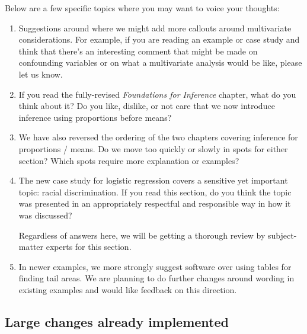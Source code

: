 \noindent%
Below are a few specific topics where you may
want to voice your thoughts:
\begin{enumerate}
\item
    Suggestions around where we might add more
    callouts around multivariate considerations.
    For example, if you are reading an example
    or case study and think that there's an
    interesting comment that might be made on
    confounding variables or on what a multivariate
    analysis would be like, please let us know.
\item
    If you read the fully-revised
    \emph{Foundations for Inference} chapter,
    what do you think about it?
    Do you like, dislike, or not care that we
    now introduce inference using proportions
    before means?
\item
    We have also reversed the ordering of the two chapters
    covering inference for proportions / means.
    Do we move too quickly or slowly in spots for either
    section?
    Which spots require more explanation or examples?
\item
    The new case study for logistic regression
    covers a sensitive yet important topic:
    racial discrimination.
    If you read this section, do you think the
    topic was presented in an appropriately respectful
    and responsible way in how it was discussed?

    Regardless of answers here, we will be getting
    a thorough review by subject-matter experts for this
    section.
\item
    In newer examples, we more strongly suggest software
    over using tables for finding tail areas.
    We are planning to do further changes around wording
    in existing examples and would like feedback on this
    direction.
    
\end{enumerate}


\subsection*{Large changes already implemented}

